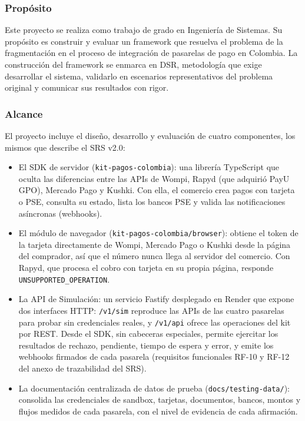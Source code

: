\subsubsection{Propósito}

Este proyecto se realiza como trabajo de grado en Ingeniería de Sistemas. Su propósito es construir y evaluar un framework que resuelva el problema de la fragmentación en el proceso de integración de pasarelas de pago en Colombia. La construcción del framework se enmarca en DSR, metodología que exige desarrollar el sistema, validarlo en escenarios representativos del problema original y comunicar sus resultados con rigor.

\subsubsection{Alcance}

El proyecto incluye el diseño, desarrollo y evaluación de cuatro componentes, los mismos que describe el SRS v2.0:

\begin{itemize}
  \item El SDK de servidor (\texttt{kit-pagos-colombia}): una librería TypeScript que oculta las diferencias entre las APIs de Wompi, Rapyd (que adquirió PayU GPO), Mercado Pago y Kushki. Con ella, el comercio crea pagos con tarjeta o PSE, consulta su estado, lista los bancos PSE y valida las notificaciones asíncronas (webhooks).
  \item El módulo de navegador (\texttt{kit-pagos-colombia/browser}): obtiene el token de la tarjeta directamente de Wompi, Mercado Pago o Kushki desde la página del comprador, así que el número nunca llega al servidor del comercio. Con Rapyd, que procesa el cobro con tarjeta en su propia página, responde \texttt{UNSUPPORTED\_OPERATION}.
  \item La API de Simulación: un servicio Fastify desplegado en Render que expone dos interfaces HTTP: \texttt{/v1/sim} reproduce las APIs de las cuatro pasarelas para probar sin credenciales reales, y \texttt{/v1/api} ofrece las operaciones del kit por REST. Desde el SDK, sin cabeceras especiales, permite ejercitar los resultados de rechazo, pendiente, tiempo de espera y error, y emite los webhooks firmados de cada pasarela (requisitos funcionales RF-10 y RF-12 del anexo de trazabilidad del SRS).
  \item La documentación centralizada de datos de prueba (\texttt{docs/testing-data/}): consolida las credenciales de sandbox, tarjetas, documentos, bancos, montos y flujos medidos de cada pasarela, con el nivel de evidencia de cada afirmación.
\end{itemize}


